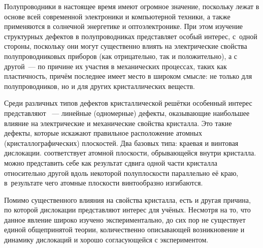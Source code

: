 \documentclass[a4paper, 14pt, titlepage]{extarticle}
\author{\theauthor,\\ кафедра физики и информационных систем КубГУ,\\ направление аспирантуры 01.04.10}
\title{\thetitle}
\date{\today{} \currenttime}
\begin{document}

  \maketitle


    \clearpage
    \tableofcontents


  \label{sec:intro}

  Полупроводники в настоящее время имеют огромное значение, поскольку лежат в основе всей
  современной электроники и компьютерной техники, а также применяются в солнечной энергетике и
  оптоэлектронике. При этом изучение структурных дефектов в полупроводниках представляет особый
  интерес, с~одной стороны, поскольку они могут существенно влиять на электрические свойства
  полупроводниковых приборов (как отрицательно, так и положительно), а с другой~--- по причине их
  участия в механических процессах, таких как пластичность, причём последнее имеет место в широком
  смысле: не только для полупроводников, но и для других кристаллических веществ.

  Среди различных типов дефектов кристаллической решётки особенный интерес представляют
  ~--- линейные (одномерные) дефекты, оказывающие наибольшее влияние на электрические и
  механические свойства кристалла. Это такие дефекты, которые искажают правильное расположение
  атомных (кристаллографических) плоскостей. Два базовых типа: краевая и винтовая дислокации.
   соответствует атомной плоскости, обрывающейся внутри кристалла.
   можно представить себе как результат сдвига одной
  части кристалла относительно другой вдоль некоторой полуплоскости параллельно её краю,
  в~результате чего атомные плоскости винтообразно изгибаются.

  Помимо существенного влияния на свойства кристалла, есть и другая причина, по которой
  дислокации представляют интерес для учёных. Несмотря на то, что данное явление широко изучено
  экспериментально, до сих пор не существует единой общепринятой теории, количественно описывающей
  возникновение и динамику дислокаций и хорошо согласующейся с экспериментом.
\end{document}
